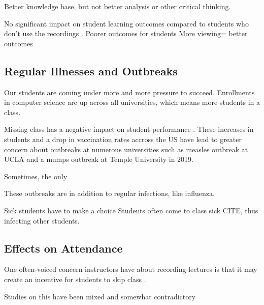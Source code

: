 \documentclass[sigconf]{acmart}
\begin{document}
Better knowledge base, but not better analysis or other critical thinking.\cite{bos2016use}


No significant impact on student learning outcomes compared to students who don't use the recordings \cite{leadbeater2013evaluating}.
Poorer outcomes for students \cite{johnston2013digital}
More viewing= better outcomes 
\cite{traphagan2010impact}
\subsection{Regular Illnesses and Outbreaks}
Our students are coming under more and more pressure to succeed.  
Enrollments in computer science are up across all universities, which means more students in a class. 

Missing class has a negative impact on student performance \cite{traphagan2010impact}.
These increases in students and a drop in vaccination rates accross the US have lead to greater concern about outbreaks at numerous universities such as measles outbreak at UCLA \cite{uclameas} and a mumps outbreak at Temple University \cite{emezienna2019resurgence} in 2019.

Sometimes, the only 

These outbreaks are in addition to regular infections, like influenza. 


Sick students have to make a choice
Students often come to class sick CITE, thus infecting other students.








\subsection{Effects on Attendance}
One often-voiced concern instructors have about recording lectures is that it may create an incentive for students to skip class \cite{larkin2010but} \cite{young2008lectures}.




Studies on this have been mixed and somewhat contradictory \cite{bos2016use}
\end{document}
